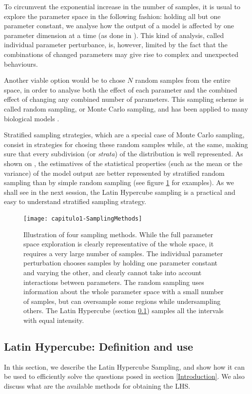 To circumvent the exponential increase in the number of samples, it is usual
to explore the parameter space in the following fashion: holding all but one
parameter constant, we analyse how the output of a model is affected by one
parameter dimension at a time (as done in \cite{Yang08}). This kind of analysis,
called individual parameter perturbance,
is, however, limited by the fact that the combinations of changed parameters 
may give rise to complex and unexpected behaviours. 

Another viable option would be to
chose $N$ random samples from the entire space, in order to analyse both
the effect of each parameter and the combined effect of changing any
combined number of parameters. This sampling scheme is called random 
sampling, or Monte Carlo sampling,
and has been applied to many biological models \cite{Letcher96}.

Stratified sampling strategies, which are a special case of Monte 
Carlo sampling, consist in strategies for chosing these random samples while,
at the same, making sure that every subdivision (or {\em strata}) of
the distribution is well represented.
As shown on \cite{McKay79}, the estimatives of the statistical properties (such
as the mean or the variance) of the model output are better represented by 
stratified random sampling than by simple random sampling
(see figure \ref{fig:SamplingMethods} for examples). As we shall see in the
next session, the Latin Hypercube sampling is a practical and easy to understand
stratified sampling strategy.

\begin{figure}[htbp]
	\begin{center}
\texttt{[image: capitulo1-SamplingMethods]}
	\end{center}
	\caption{Illustration of four sampling methods. While the
	full parameter space exploration is clearly representative
	of the whole space, it requires a very large number of samples.
	The individual parameter perturbation chooses samples by
	holding one parameter constant and varying the other, and
	clearly cannot take into account interactions between 
	parameters. The random sampling uses information about the
	whole parameter space with a small number of samples, but
	can oversample some regions while undersampling others. The
	Latin Hypercube (section \ref {LHS}) samples all the 
	intervals with equal intensity.}
	\label{fig:SamplingMethods}
\end{figure}

\subsection{Latin Hypercube: Definition and use}\label{LHS}
In this section, we describe the Latin Hypercube Sampling, and show how it can
be used to efficiently solve the questions posed in section \ref{Introduction}.
We also
discuss what are the available methods for obtaining the LHS. 

